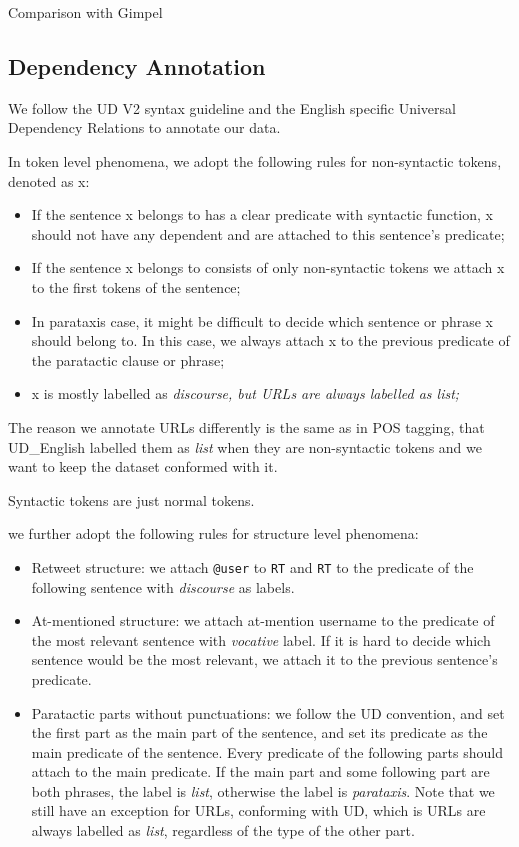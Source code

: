 \documentclass[11pt,letterpaper]{article}
\begin{document}
Comparison with Gimpel



\subsection{Dependency Annotation}
We follow the UD V2 syntax guideline and the English specific Universal Dependency Relations to annotate our data.

In token level phenomena, we adopt the following rules for non-syntactic tokens, denoted as x: 

\begin{itemize}
\item If the sentence x belongs to has a clear predicate with syntactic function, x should not have any dependent and are attached to this sentence’s predicate;
\item If the sentence x belongs to consists of only non-syntactic tokens we attach x to the first tokens of the sentence;
\item In parataxis case, it might be difficult to decide which sentence or phrase x should belong to. In this case, we always attach x to the previous predicate of the paratactic clause or phrase;
\item x is mostly labelled as \it{discourse}, but URLs are always labelled as \it{list};
\end{itemize}

The reason we annotate URLs differently is the same as in POS tagging, that UD\_English labelled them as {\it list} when they are non-syntactic tokens and we want to keep the dataset conformed with it.

Syntactic tokens are just normal tokens.

we further adopt the following rules for structure level phenomena:

\begin{itemize}
\item Retweet structure: we attach {\tt @user} to {\tt RT} and {\tt RT} to the predicate of the following sentence with {\it discourse} as labels.
\item At-mentioned structure: we attach at-mention username to the predicate of the most relevant sentence with {\it vocative} label. If it is hard to decide which sentence would be the most relevant, we attach it to the previous sentence's predicate.
\item Paratactic parts without punctuations: we follow the UD convention, and set the first part as the main part of the sentence, and set its predicate as the main predicate of the sentence. Every predicate of the following parts should attach to the main predicate. If the main part and some following part are both phrases, the label is {\it list}, otherwise the label is {\it parataxis}. Note that we still have an exception for URLs, conforming with UD, which is URLs are always labelled as {\it list}, regardless of the type of the other part.
\end{itemize}
\end{document}
